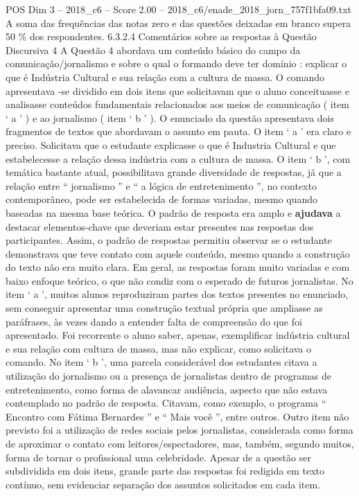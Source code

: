 \begin{textsample}{POS Dim 3 – 2018\_c6 – Score 2.00 – 2018\_c6/enade\_2018\_jorn\_757f1bfa09.txt}
A soma das frequências das notas zero e das questões deixadas em branco supera 50 \% dos respondentes. 6.3.2.4 Comentários sobre as respostas à Questão Discursiva 4 A Questão 4 abordava um conteúdo básico do campo da comunicação/jornalismo e sobre o qual o formando deve ter domínio : explicar o que é Indústria Cultural e sua relação com a cultura de massa.
O comando apresentava -se dividido em dois itens que solicitavam que o aluno conceituasse e analisasse conteúdos fundamentais relacionados aos meios de comunicação ( item ‘ a ’ ) e ao jornalismo ( item ‘ b ’ ).
O enunciado da questão apresentava dois fragmentos de textos que abordavam o assunto em pauta.
O item ‘ a ’ era claro e preciso.
Solicitava que o estudante explicasse o que é Industria Cultural e que estabelecesse a relação dessa indústria com a cultura de massa.
O item ‘ b ’, com temática bastante atual, possibilitava grande diversidade de respostas, já que a relação entre “ jornalismo ” e “ a lógica de entretenimento ”, no contexto contemporâneo, pode ser estabelecida de formas variadas, mesmo quando baseadas na mesma base teórica.
O padrão de resposta era amplo e \textbf{ajudava} a destacar elementos-chave que deveriam estar presentes nas respostas dos participantes.
Assim, o padrão de respostas permitiu observar se o estudante demonstrava que teve contato com aquele conteúdo, mesmo quando a construção do texto não era muito clara.
Em geral, as respostas foram muito variadas e com baixo enfoque teórico, o que não condiz com o esperado de futuros jornalistas.
No item ‘ a ’, muitos alunos reproduziram partes dos textos presentes no enunciado, sem conseguir apresentar uma construção textual própria que ampliasse as paráfrases, às vezes dando a entender falta de compreensão do que foi apresentado.
Foi recorrente o aluno saber, apenas, exemplificar indústria cultural e sua relação com cultura de massa, mas não explicar, como solicitava o comando.
No item ‘ b ’, uma parcela considerável dos estudantes citava a utilização do jornalismo ou a presença de jornalistas dentro de programas de entretenimento, como forma de alavancar audiência, aspecto que não estava contemplado no padrão de resposta.
Citavam, como exemplo, o programa “ Encontro com Fátima Bernardes ” e “ Mais você ”, entre outros.
Outro item não previsto foi a utilização de redes sociais pelos jornalistas, considerada como forma de aproximar o contato com leitores/espectadores, mas, também, segundo muitos, forma de tornar o profissional uma celebridade.
Apesar de a questão ser subdividida em dois itens, grande parte das respostas foi redigida em texto contínuo, sem evidenciar separação dos assuntos solicitados em cada item.

\end{textsample}
